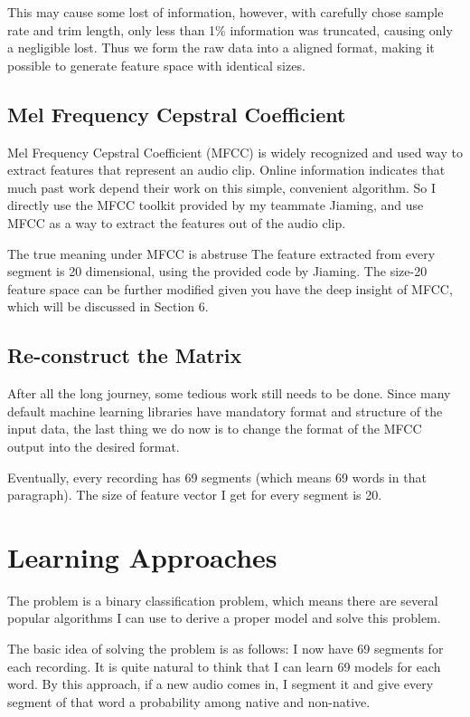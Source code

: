\documentclass{sig-alternate}
\begin{document}
This may cause some lost of information, however, with carefully chose sample rate and trim length, only less than 1\% information was truncated, causing only a negligible lost. Thus we form the raw data into a aligned format, making it possible to generate feature space with identical sizes.


\subsection{Mel Frequency Cepstral Coefficient}
Mel Frequency Cepstral Coefficient (MFCC) is widely recognized and used way to extract features that represent an audio clip. Online information indicates that much past work depend their work on this simple, convenient algorithm. So I directly use the MFCC toolkit provided by my teammate Jiaming, and use MFCC as a way to extract the features out of the audio clip.

The true meaning under MFCC is abstruse \cite{mfcc} The feature extracted from every segment is 20 dimensional, using the provided code by Jiaming. The size-20 feature space can be further modified given you have the deep insight of MFCC, which will be discussed in Section 6.

\subsection{Re-construct the Matrix}
After all the long journey, some tedious work still needs to be done. Since many default machine learning libraries have mandatory format and structure of the input data, the last thing we do now is to change the format of the MFCC output into the desired format.

Eventually, every recording has 69 segments (which means 69 words in that paragraph). The size of feature vector I get for every segment is 20.




\section{Learning Approaches}
The problem is a binary classification problem, which means there are several popular algorithms I can use to derive a proper model and solve this problem. 

The basic idea of solving the problem is as follows: I now have 69 segments for each recording. It is quite natural to think that I can learn 69 models for each word. By this approach, if a new audio comes in, I segment it and give every segment of that word a probability among native and non-native. 
\end{document}

